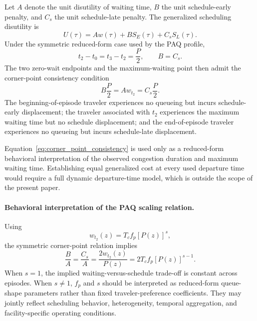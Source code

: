 Let $A$ denote the unit disutility of waiting time, $B$ the unit schedule-early
penalty, and $C_s$ the unit schedule-late penalty. The generalized scheduling
disutility is
\begin{equation}
\label{eq:ABC_schedule_cost}
U(\tau)
=
A w(\tau)
+
B S_E(\tau)
+
C_s S_L(\tau).
\end{equation}
Under the symmetric reduced-form case used by the PAQ profile,
\begin{equation}
t_2-t_0=t_3-t_2=\frac{P}{2},
\qquad
B=C_s.
\end{equation}
The two zero-wait endpoints and the maximum-waiting point then admit the
corner-point consistency condition
\begin{equation}
\label{eq:corner_point_consistency}
B\frac{P}{2}
=
A w_{t_2}
=
C_s\frac{P}{2}.
\end{equation}
The beginning-of-episode traveler experiences no queueing but incurs
schedule-early displacement; the traveler associated with $t_2$ experiences
the maximum waiting time but no schedule displacement; and the
end-of-episode traveler experiences no queueing but incurs schedule-late
displacement.

Equation~\eqref{eq:corner_point_consistency} is used only as a reduced-form
behavioral interpretation of the observed congestion duration and maximum
waiting time. Establishing equal generalized cost at every used departure
time would require a full dynamic departure-time model, which is outside the
scope of the present paper.

\paragraph{Behavioral interpretation of the PAQ scaling relation.}
Using
\begin{equation}
w_{t_2}(z)=T_c f_p[P(z)]^s,
\end{equation}
the symmetric corner-point relation implies
\begin{equation}
\label{eq:ABC_qvdf_interpretation}
\frac{B}{A}
=
\frac{C_s}{A}
=
\frac{2w_{t_2}(z)}{P(z)}
=
2T_c f_p[P(z)]^{s-1}.
\end{equation}
When $s=1$, the implied waiting-versus-schedule trade-off is constant across
episodes. When $s\neq1$, $f_p$ and $s$ should be interpreted as reduced-form
queue-shape parameters rather than fixed traveler-preference coefficients.
They may jointly reflect scheduling behavior, heterogeneity, temporal
aggregation, and facility-specific operating conditions.


